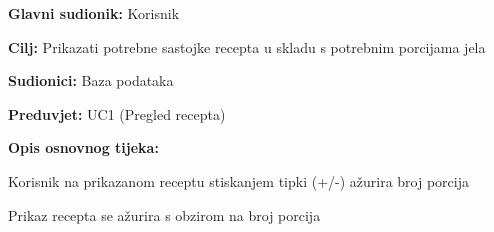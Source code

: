					\noindent {}
					\begin{packed_item}
						
						\item \textbf{Glavni sudionik: }Korisnik
						\item \textbf{Cilj: }Prikazati potrebne sastojke recepta u skladu s potrebnim porcijama jela
						\item \textbf{Sudionici: }Baza podataka
						\item \textbf{Preduvjet: }UC1 (Pregled recepta)
						\item \textbf{Opis osnovnog tijeka:}
						
						\item[] \begin{packed_enum}
							\item Korisnik na prikazanom receptu stiskanjem tipki (+/-) ažurira broj porcija
							\item Prikaz recepta se ažurira s obzirom na broj porcija
						\end{packed_enum}
					\end{packed_item}

